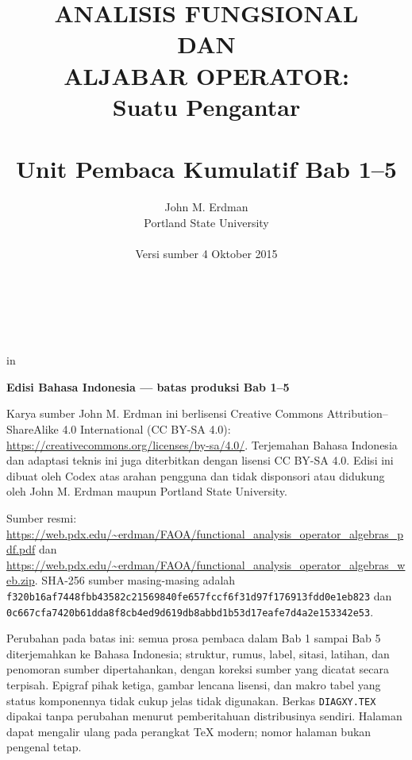 \documentclass[11pt,reqno]{amsbook}
\theoremstyle{definition}
\theoremstyle{remark}
\numberwithin{equation}{section}
\begin{document}
 \frontmatter
 \title{ANALISIS FUNGSIONAL \\ DAN \\ ALJABAR OPERATOR: \\ Suatu Pengantar \\ \mbox{} \\ \large Unit Pembaca Kumulatif Bab 1--5}
 \author{John M. Erdman \\
      Portland State University \\
      \mbox{\hphantom{P}} \\
      Versi sumber 4 Oktober 2015 \\
      \mbox{\hphantom{P}} \\
      \mbox{\hphantom{P}} \\
            \mbox{\hphantom{P}} \\
                  \mbox{\hphantom{P}} }


 in


\maketitle


\begin{center}
\textbf{Edisi Bahasa Indonesia --- batas produksi Bab 1--5}
\end{center}

Karya sumber John M. Erdman ini berlisensi Creative Commons
Attribution--ShareAlike 4.0 International (CC BY-SA 4.0):
\url{https://creativecommons.org/licenses/by-sa/4.0/}.
Terjemahan Bahasa Indonesia dan adaptasi teknis ini juga diterbitkan dengan
lisensi CC BY-SA 4.0. Edisi ini dibuat oleh Codex atas arahan pengguna dan tidak
disponsori atau didukung oleh John M. Erdman maupun Portland State University.

\begin{sloppypar}
Sumber resmi:
\url{https://web.pdx.edu/~erdman/FAOA/functional_analysis_operator_algebras_pdf.pdf}
dan
\url{https://web.pdx.edu/~erdman/FAOA/functional_analysis_operator_algebras_web.zip}.
SHA-256 sumber masing-masing adalah
\texttt{f320b16af7448fbb43582c21569840fe\allowbreak657fccf6f31d97f176913fdd0e1eb823}
dan
\texttt{0c667cfa7420b61dda8f8cb4ed9d619d\allowbreak b8abbd1b53d17eafe7d4a2e153342e53}.
\end{sloppypar}

Perubahan pada batas ini: semua prosa pembaca dalam Bab 1 sampai Bab 5
diterjemahkan ke Bahasa Indonesia; struktur, rumus, label, sitasi, latihan,
dan penomoran sumber dipertahankan, dengan koreksi sumber yang dicatat secara
terpisah. Epigraf pihak ketiga, gambar lencana lisensi, dan makro tabel yang
status komponennya tidak cukup jelas tidak digunakan. Berkas
\texttt{DIAGXY.TEX} dipakai tanpa perubahan menurut pemberitahuan distribusinya
sendiri. Halaman dapat
mengalir ulang pada perangkat TeX modern; nomor halaman bukan pengenal tetap.
\end{document}
